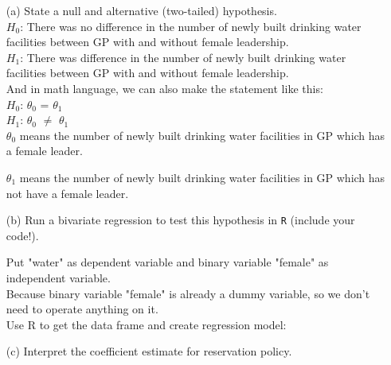 \documentclass[12pt,letterpaper]{article}
\begin{document}
\newpage
\begin{enumerate}
	\item [(a)] State a null and alternative (two-tailed) hypothesis. 
	\vspace{.5cm} \\
	$H_0$: There was no difference in the number of newly built drinking water facilities between GP with and without female leadership. \\
	
	$H_1$: There was difference  in the number of newly built drinking water facilities between GP with and without female leadership. \\
	
	And in math language, we can also make the statement like this: \\
	
	$H_0$: $\theta_0$ = $\theta_1$\\
	$H_1$: $\theta_0$ $\neq$ $\theta_1$ 
	\vspace{.5cm} \\
	$\theta_0$ means the number of newly built drinking water facilities in GP which has a female leader.
	
	$\theta_1$ means the number of newly built drinking water facilities in GP which has not have a female leader.
	\newpage
	\item [(b)] Run a bivariate regression to test this hypothesis in \texttt{R} (include your code!).
	
	Put "water" as dependent variable and binary variable "female" as independent variable.\\
	Because binary variable "female" is already a dummy variable, so we don't need to operate anything on it.\\
	
	Use R to get the data frame and create regression model: \\
	
	
	\newpage
	\item [(c)] Interpret the coefficient estimate for reservation policy. 
\end{enumerate}
\end{document}
